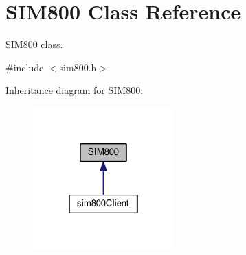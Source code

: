 \hypertarget{classSIM800}{}\section{S\+I\+M800 Class Reference}
\label{classSIM800}


\hyperlink{classSIM800}{S\+I\+M800} class.  




{\ttfamily \#include $<$sim800.\+h$>$}



Inheritance diagram for S\+I\+M800\+:
\nopagebreak
\begin{figure}[H]
\begin{center}
\leavevmode
\includegraphics[width=154pt]{classSIM800__inherit__graph}
\end{center}
\end{figure}
